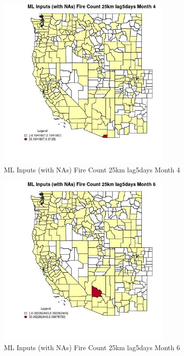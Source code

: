 \begin{figure} 
\centering  
\includegraphics[width=0.77\textwidth]{Code_Outputs/Report_ML_input_PM25_Step4_part_e_de_duplicated_aves_compiled_2019-05-21wNAs_CountyFire_Count_25km_lag5daysmedianMonth4.jpg} 
\caption{\label{fig:Report_ML_input_PM25_Step4_part_e_de_duplicated_aves_compiled_2019-05-21wNAsCountyFire_Count_25km_lag5daysmedianMonth4}ML Inputs (with NAs) Fire Count 25km lag5days Month 4} 
\end{figure} 
 

\begin{figure} 
\centering  
\includegraphics[width=0.77\textwidth]{Code_Outputs/Report_ML_input_PM25_Step4_part_e_de_duplicated_aves_compiled_2019-05-21wNAs_CountyFire_Count_25km_lag5daysmedianMonth6.jpg} 
\caption{\label{fig:Report_ML_input_PM25_Step4_part_e_de_duplicated_aves_compiled_2019-05-21wNAsCountyFire_Count_25km_lag5daysmedianMonth6}ML Inputs (with NAs) Fire Count 25km lag5days Month 6} 
\end{figure} 
 

